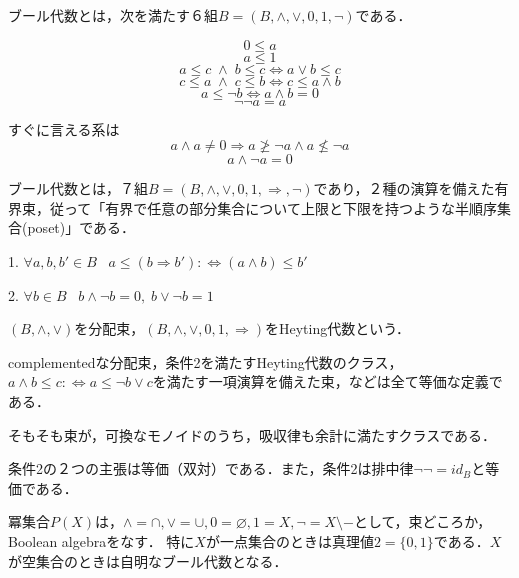 \documentclass[uplatex, 12pt, dvipdfmx]{jsarticle}
\begin{document}
\begin{definition*}[ブール代数１]
    ブール代数とは，次を満たす６組$B=(B,\land,\lor,0,1,\lnot)$である．

    \[ 0\le a \]
    \[ a\le 1 \]
    \[ a\le c\;\land\; b\le c\Leftrightarrow a\lor b\le c \]
    \[ c\le a \;\land\; c\le b \Leftrightarrow c\le a\land b \]
    \begin{equation}\label{formula-BooleanAlgebra-introduction-of-not}
        a\le\lnot b\Leftrightarrow a\land b=0
    \end{equation}
    \begin{equation}\label{formula-BooleanAlgebra-excluded-middle}
        \lnot\lnot a=a
    \end{equation}
\end{definition*}
\begin{remark*}
    すぐに言える系は
    \[ a\land a\ne 0\Rightarrow a\ngeq \lnot a \land a\nleq\lnot a  \]
    \[ a\land\lnot a=0 \]
\end{remark*}
\begin{definition*}[ブール代数２]
    ブール代数とは，７組$B=(B,\land,\lor,0,1,\Rightarrow,\lnot)$であり，２種の演算を備えた有界束，従って「有界で任意の部分集合について上限と下限を持つような半順序集合(poset)」である．

    1. $\forall a,b,b'\in B\;\;\; a\le (b\Rightarrow b'):\Leftrightarrow (a\land b)\le b'$
    
    2. $\forall b\in B\;\;\; b\land\lnot b=0,\; b\lor\lnot b=1$
\end{definition*}
\begin{remark*}
    $(B,\land,\lor)$を分配束，$(B,\land,\lor,0,1,\Rightarrow)$をHeyting代数という．

    complementedな分配束，条件2を満たすHeyting代数のクラス，$a\land b\le c:\Leftrightarrow a\le\lnot b\lor c$を満たす一項演算を備えた束，などは全て等価な定義である．

    そもそも束が，可換なモノイドのうち，吸収律も余計に満たすクラスである．

    条件2の２つの主張は等価（双対）である．また，条件2は排中律$\lnot\lnot = id_B$と等価である．
\end{remark*}
\begin{example*}
    冪集合$P(X)$は，$\land=\cap, \lor=\cup, 0=\varnothing, 1=X, \lnot=X\setminus -$として，束どころか，Boolean algebraをなす．
    特に$X$が一点集合のときは真理値$2=\{0,1\}$である．$X$が空集合のときは自明なブール代数となる．
\end{example*}
\end{document}
